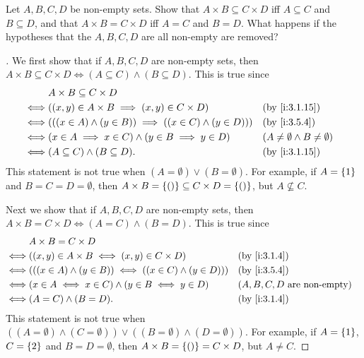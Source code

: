 \begin{ex}\label{i:ex:3.5.6}
  Let \(A, B, C, D\) be non-empty sets.
  Show that \(A \times B \subseteq C \times D\) iff \(A \subseteq C\) and \(B \subseteq D\), and that \(A \times B = C \times D\) iff \(A = C\) and \(B = D\).
  What happens if the hypotheses that the \(A, B, C, D\) are all non-empty are removed?
\end{ex}

\begin{proof}[]
  We first show that if \(A, B, C, D\) are non-empty sets, then \(A \times B \subseteq C \times D \iff (A \subseteq C) \land (B \subseteq D)\).
  This is true since
  \begin{align*}
         & A \times B \subseteq C \times D                                                                                      \\
    \iff & \pa{(x, y) \in A \times B \implies (x, y) \in C \times D}             &  & \by{i:3.1.15}                             \\
    \iff & \pa{((x \in A) \land (y \in B)) \implies ((x \in C) \land (y \in D))} &  & \by{i:3.5.4}                              \\
    \iff & \pa{x \in A \implies x \in C} \land \pa{y \in B \implies y \in D}     &  & (A \neq \emptyset \land B \neq \emptyset) \\
    \iff & (A \subseteq C) \land (B \subseteq D).                                &  & \by{i:3.1.15}
  \end{align*}
  This statement is not true when \((A = \emptyset) \lor (B = \emptyset)\).
  For example, if \(A = \left\lbrace1\right\rbrace\) and \(B = C = D = \emptyset\), then \(A \times B = \left\lbrace()\right\rbrace \subseteq C \times D = \left\lbrace()\right\rbrace\), but \(A \not \subseteq C\).

  Next we show that if \(A, B, C, D\) are non-empty sets, then \(A \times B = C \times D \iff (A = C) \land (B = D)\).
  This is true since
  \begin{align*}
         & A \times B = C \times D                                                                                      \\
    \iff & \pa{(x, y) \in A \times B \iff (x, y) \in C \times D}             &  & \by{i:3.1.4}                          \\
    \iff & \pa{((x \in A) \land (y \in B)) \iff ((x \in C) \land (y \in D))} &  & \by{i:3.5.4}                          \\
    \iff & (x \in A \iff x \in C) \land (y \in B \iff y \in D)               &  & \text{(\(A, B, C, D\) are non-empty)} \\
    \iff & (A = C) \land (B = D).                                            &  & \by{i:3.1.4}
  \end{align*}
  This statement is not true when \(((A = \emptyset) \land (C = \emptyset)) \lor ((B = \emptyset) \land (D = \emptyset))\).
  For example, if \(A = \left\lbrace1\right\rbrace\), \(C = \left\lbrace2\right\rbrace\) and \(B = D = \emptyset\), then \(A \times B = \left\lbrace()\right\rbrace = C \times D\), but \(A \neq C\).
\end{proof}

